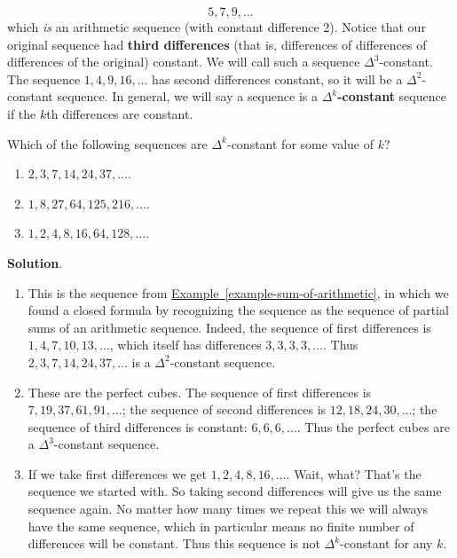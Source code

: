 \documentclass[11pt,]{book}
\newcommand{\terminology}[1]{\textbf{#1}}
\theoremstyle{ptxplainnotitle}
\theoremstyle{ptxplaintitle}
\theoremstyle{ptxdefinitionnotitle}
\theoremstyle{ptxdefinitiontitle}
\theoremstyle{ptxdefinitionnotitle}
\theoremstyle{ptxdefinitiontitle}
\theoremstyle{ptxdefinitionnotitle}
\theoremstyle{ptxdefinitiontitle}
\theoremstyle{ptxdefinitiontitlenonumber}
\theoremstyle{ptxdefinitiontitlenonumber}
\numberwithin{equation}{chapter}
\begin{document}
\begin{equation*}
5, 7, 9, \ldots
\end{equation*}
which \emph{is} an arithmetic sequence (with constant difference 2). Notice that our original sequence had \terminology{third differences} (that is, differences of differences of differences of the original) constant. We will call such a sequence \(\Delta^3\)-constant. The sequence \(1, 4, 9, 16, \ldots\) has second differences constant, so it will be a \(\Delta^2\)-constant sequence. In general, we will say a sequence is a \terminology{\(\Delta^k\)-constant}\label{notation-4}
 sequence if the \(k\)th differences are constant.%
\begin{example}\label{example-deltak}
\hypertarget{p-347}{}%
Which of the following sequences are \(\Delta^k\)-constant for some value of \(k\)? \leavevmode%
\begin{enumerate}
\item\hypertarget{li-198}{}\(2, 3, 7, 14, 24, 37,\ldots\).%
\item\hypertarget{li-199}{}\(1, 8, 27, 64, 125, 216, \ldots\).%
\item\hypertarget{li-200}{}\(1,2,4,8,16,64,128,\ldots\).%
\end{enumerate}
%
\par\smallskip%
\noindent\textbf{Solution}.\hypertarget{solution-41}{}\quad%
\hypertarget{p-348}{}%
\leavevmode%
\begin{enumerate}
\item\hypertarget{li-201}{}This is the sequence from \hyperref[example-sum-of-arithmetic]{Example~\ref{example-sum-of-arithmetic}}, in which we found a closed formula by recognizing the sequence as the sequence of partial sums of an arithmetic sequence. Indeed, the sequence of first differences is \(1,4,7, 10, 13,\ldots\), which itself has differences \(3,3,3,3,\ldots\). Thus \(2, 3, 7, 14, 24, 37,\ldots\) is a \(\Delta^2\)-constant sequence.%
\item\hypertarget{li-202}{}These are the perfect cubes. The sequence of first differences is \(7, 19, 37, 61, 91, \ldots\); the sequence of second differences is \(12, 18, 24, 30,\ldots\); the sequence of third differences is constant: \(6,6,6,\ldots\). Thus the perfect cubes are a \(\Delta^3\)-constant sequence.%
\item\hypertarget{li-203}{}If we take first differences we get \(1,2,4,8,16,\ldots\). Wait, what? That's the sequence we started with. So taking second differences will give us the same sequence again. No matter how many times we repeat this we will always have the same sequence, which in particular means no finite number of differences will be constant. Thus this sequence is not \(\Delta^k\)-constant for any \(k\).%
\end{enumerate}
%
\end{example}
\end{document}
